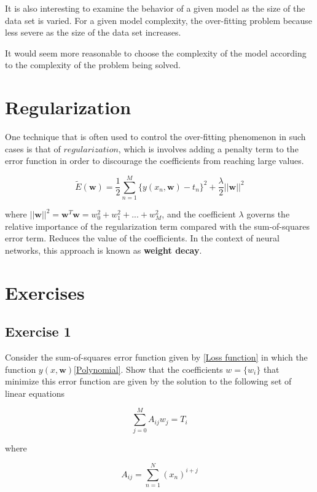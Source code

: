 It is also interesting to examine the behavior of a given model as the size of the data set is varied. For a given model complexity, the over-fitting problem because less severe as the size of the data set increases.

It would seem more reasonable to choose the complexity of the model according to the complexity of the problem being solved.

\section{Regularization}

One technique that is often used to control the over-fitting phenomenon in such cases is that of $regularization$, which is involves adding a penalty term to the error function in order to discourage the coefficients from reaching large values.

\begin{equation}
    \tilde{E}(\pmb{w}) = \frac{1}{2}\sum_{n=1}^M \{y(x_n, \pmb{w}) - t_n \}^2 + \frac{\lambda}{2}||\pmb{w}||^2
\end{equation}

where $||\pmb{w}||^2 = \pmb{w}^T\pmb{w} = w_0^2 + w_1^2 + ... + w_M^2$, and the coefficient $\lambda$ governs the relative importance of the regularization term compared with the sum-of-squares error term. Reduces the value of the coefficients. In the context of neural networks, this approach is known as \textbf{weight decay}.

\section{Exercises}

\subsection{Exercise 1}

Consider the sum-of-squares error function given by \ref{Loss function} in which the function  $y(x, \pmb{w})$\ref{Polynomial}. Show that the coefficients $w=\{w_i\}$ that minimize this error function are given by the solution to the following set of linear equations

\begin{equation}
    \sum_{j=0}^M A_{ij}w_j = T_i
\end{equation}

where

\begin{equation}
    A_{ij} = \sum_{n=1}^N (x_n)^{i + j}
\end{equation}

